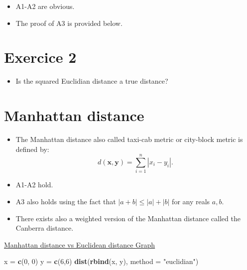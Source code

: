 \documentclass[
]{article}
\newenvironment{Shaded}{\begin{snugshade}}{\end{snugshade}}
\newcommand{\DataTypeTok}[1]{\textcolor[rgb]{0.13,0.29,0.53}{#1}}
\newcommand{\DecValTok}[1]{\textcolor[rgb]{0.00,0.00,0.81}{#1}}
\newcommand{\KeywordTok}[1]{\textcolor[rgb]{0.13,0.29,0.53}{\textbf{#1}}}
\newcommand{\NormalTok}[1]{#1}
\newcommand{\StringTok}[1]{\textcolor[rgb]{0.31,0.60,0.02}{#1}}
\providecommand{\tightlist}{%
  \setlength{\itemsep}{0pt}\setlength{\parskip}{0pt}}
\begin{document}
\begin{itemize}
\tightlist
\item
  A1-A2 are obvious.
\item
  The proof of A3 is provided below.
\end{itemize}

\hypertarget{exercice-2}{%
\section{Exercice 2}\label{exercice-2}}

\begin{itemize}
\tightlist
\item
  Is the squared Euclidian distance a true distance?
\end{itemize}

\hypertarget{manhattan-distance}{%
\section{Manhattan distance}\label{manhattan-distance}}

\begin{itemize}
\tightlist
\item
  The Manhattan distance also called taxi-cab metric or city-block
  metric is defined by: \[d(\mathbf{x},\mathbf{y})
  =\sum_{i=1}^n |x_i-y_i|.
  \]
\item
  A1-A2 hold.
\item
  A3 also holds using the fact that \(|a+b|\leq |a|+|b|\) for any reals
  \(a,b\).
\item
  There exists also a weighted version of the Manhattan distance called
  the Canberra distance.
\end{itemize}

\href{https://upload.wikimedia.org/wikipedia/commons/0/08/Manhattan_distance.svg}{Manhattan
distance vs Euclidean distance Graph}

\begin{Shaded}
\begin{Highlighting}[]
\NormalTok{x =}\StringTok{ }\KeywordTok{c}\NormalTok{(}\DecValTok{0}\NormalTok{, }\DecValTok{0}\NormalTok{)}
\NormalTok{y =}\StringTok{ }\KeywordTok{c}\NormalTok{(}\DecValTok{6}\NormalTok{,}\DecValTok{6}\NormalTok{)}
\KeywordTok{dist}\NormalTok{(}\KeywordTok{rbind}\NormalTok{(x, y), }\DataTypeTok{method =} \StringTok{"euclidian"}\NormalTok{)}
\end{Highlighting}
\end{Shaded}
\end{document}
